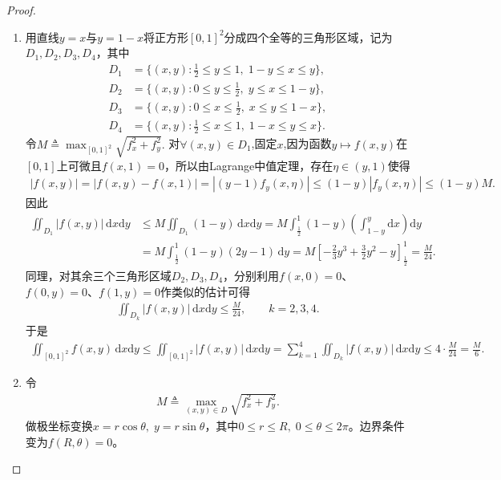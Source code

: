 \documentclass[../../main.tex]{subfiles}%
\begin{document}
\begin{proof}
\begin{enumerate}[(1)]
\item 用直线$y=x$与$y=1-x$将正方形$[0,1]^2$分成四个全等的三角形区域，记为$D_1,D_2,D_3,D_4$，其中
\begin{align*}
D_1&=\{(x,y):\frac12\leqslant y\leqslant 1,\; 1-y\leqslant x\leqslant y\}, \\
D_2&=\{(x,y):0\leqslant y\leqslant \frac12,\; y\leqslant x\leqslant 1-y\}, \\
D_3&=\{(x,y):0\leqslant x\leqslant \frac12,\; x\leqslant y\leqslant 1-x\}, \\
D_4&=\{(x,y):\frac12\leqslant x\leqslant 1,\; 1-x\leqslant y\leqslant x\}.
\end{align*}
令$M\triangleq \max_{[0,1]^2}\sqrt{f_x^2+f_y^2}.$
对$\forall (x,y)\in D_1$,固定$x$,因为函数$y\mapsto f(x,y)$在$[0,1]$上可微且$f(x,1)=0$，所以由Lagrange中值定理，存在$\eta\in(y,1)$使得
\begin{align*}
|f(x,y)|=|f(x,y)-f(x,1)|=|(y-1)f_y(x,\eta)|\leqslant (1-y)|f_y(x,\eta)|\leqslant (1-y)M.
\end{align*}
因此
\begin{align*}
\iint_{D_1}|f(x,y)|\,\mathrm{d}x\mathrm{d}y
&\leqslant M\iint_{D_1}(1-y)\,\mathrm{d}x\mathrm{d}y =M\int_{\frac{1}{2}}^{1}(1-y)\left(\int_{1-y}^{y}\mathrm{d}x\right)\mathrm{d}y \\
&=M\int_{\frac{1}{2}}^{1}(1-y)(2y-1)\,\mathrm{d}y =M\left[-\frac{2}{3}y^3+\frac{3}{2}y^2-y\right]_{\frac{1}{2}}^{1} =\frac{M}{24}.
\end{align*}
同理，对其余三个三角形区域$D_2,D_3,D_4$，分别利用$f(x,0)=0$、$f(0,y)=0$、$f(1,y)=0$作类似的估计可得
\begin{align*}
\iint_{D_k}|f(x,y)|\,\mathrm{d}x\mathrm{d}y\leqslant \frac{M}{24},\qquad k=2,3,4.
\end{align*}
于是
\begin{align*}
\iint_{[0,1]^2} f(x,y)\,\mathrm{d}x\mathrm{d}y
\leqslant \iint_{[0,1]^2}|f(x,y)|\,\mathrm{d}x\mathrm{d}y =\sum_{k=1}^{4}\iint_{D_k}|f(x,y)|\,\mathrm{d}x\mathrm{d}y 
\leqslant 4\cdot\frac{M}{24} =\frac{M}{6}.
\end{align*}

\item 令
\begin{align*}
M\triangleq \max_{(x,y)\in D}\sqrt{f_x^2+f_y^2}.
\end{align*}
做极坐标变换$x=r\cos\theta,\; y=r\sin\theta$，其中$0\leqslant r\leqslant R,\; 0\leqslant \theta\leqslant 2\pi$。边界条件变为$f(R,\theta)=0$。


\end{enumerate}
\end{proof}
\end{document}
